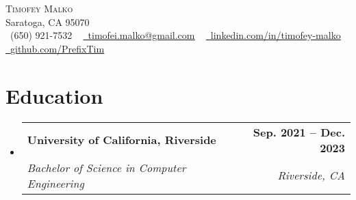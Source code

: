 \documentclass[letterpaper,11pt]{article}
\makeatletter
\newcommand{\resumeSubheading}[4]{
  \vspace{-2pt}\item
    \begin{tabular*}{1.0\textwidth}[t]{l@{\extracolsep{\fill}}r}
      \textbf{#1} & \textbf{\small #2} \\
      \textit{\small#3} & \textit{\small #4} \\
    \end{tabular*}\vspace{-7pt}
}
\newcommand{\resumeSubHeadingListStart}{\begin{itemize}[leftmargin=0.0in, label={}]}
\newcommand{\resumeSubHeadingListEnd}{\end{itemize}}
\makeatother
\begin{document}

\begin{center}
    {\Huge \scshape Timofey Malko} \\ \vspace{1pt}
    Saratoga, CA 95070 \\ \vspace{1pt}
    \small \raisebox{-0.1\height}\faPhone\ (650) 921-7532 ~ \href{mailto:timofei.malko@gmail.com}{\raisebox{-0.2\height}\faEnvelope\  \underline{timofei.malko@gmail.com}} ~ 
    \href{https://www.linkedin.com/in/timofey-malko/}{\raisebox{-0.2\height}\faLinkedin\ \underline{linkedin.com/in/timofey-malko}}  ~
    \href{https://github.com/PrefixTim}{\raisebox{-0.2\height}\faGithub\ \underline{github.com/PrefixTim}}
    \vspace{-8pt}
\end{center}


\section{Education}
  \resumeSubHeadingListStart
    \resumeSubheading
      {University of California, Riverside}{Sep. 2021 -- Dec. 2023}
      {Bachelor of Science in Computer Engineering}{Riverside, CA}
  \resumeSubHeadingListEnd

\end{document}

